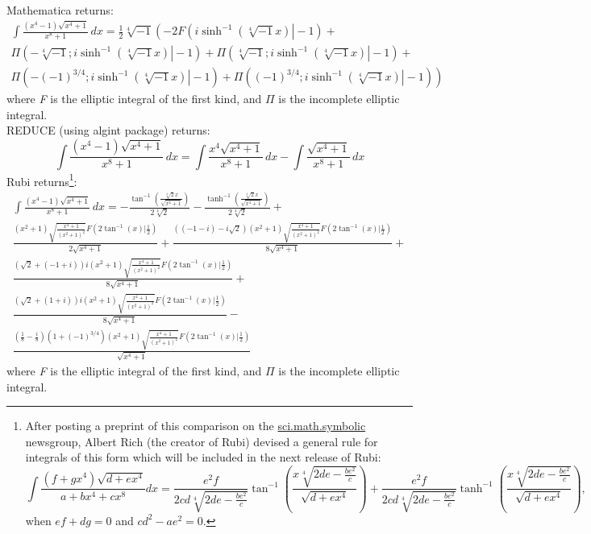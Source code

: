 \documentclass[12pt]{article}
\numberwithin{equation}{section}
\theoremstyle{definition}
\begin{document}
\normalsize
Mathematica returns:
\small
\begin{multline*}
\int \frac{\left(x^4-1\right) \sqrt{x^4+1}}{x^8+1} \, dx = \frac{1}{2} \sqrt[4]{-1} \left(-2 F\left(\left.i \sinh ^{-1}\left(\sqrt[4]{-1} x\right)\right|-1\right) \right. + \\
\Pi\left(-\sqrt[4]{-1};\left.i \sinh ^{-1}\left(\sqrt[4]{-1} x\right)\right|-1\right) + 
\Pi \left(\sqrt[4]{-1};\left.i \sinh ^{-1}\left(\sqrt[4]{-1} x\right)\right|-1\right) + \\
\left. \Pi\left(-(-1)^{3/4};\left.i \sinh ^{-1}\left(\sqrt[4]{-1} x\right)\right|-1\right)+\Pi \left((-1)^{3/4};\left.i \sinh ^{-1}\left(\sqrt[4]{-1} x\right)\right|-1\right)\right)
\end{multline*}
\normalsize
where \textit{F} is the elliptic integral of the first kind, and $\Pi$ is the incomplete elliptic integral. \\

\noindent REDUCE (using algint package) returns:
\small
$$\int \frac{\left(x^4-1\right) \sqrt{x^4+1}}{x^8+1} \, dx = 
\int \frac{x^4 \sqrt{x^4+1}}{x^8+1} \, dx-\int \frac{\sqrt{x^4+1}}{x^8+1} \, dx$$
\normalsize
Rubi returns\footnote{After posting a preprint of this comparison on the 
\href{https://groups.google.com/forum/\#!forum/sci.math.symbolic}{sci.math.symbolic}
newsgroup, Albert Rich (the creator of Rubi) devised a general rule for integrals of this 
form which will be included in the next release of Rubi: %
$$\int\frac{\left(f+g x^4\right)\sqrt{d+e x^4}}{a+b x^4+c x^8} dx = 
\frac{e^2 f}{2 c d \sqrt[4]{2 d e-\frac{b e^2}{c}}} \tan ^{-1}\left(\frac{x \sqrt[4]{2 d e-\frac{b e^2}{c}}}{\sqrt{d+e x^4}}\right) 
	+\frac{e^2 f}{2 c d \sqrt[4]{2 d e-\frac{b e^2}{c}}} \tanh ^{-1}\left(\frac{x \sqrt[4]{2 d e-\frac{be^2}{c}}}{\sqrt{d+e x^4}}\right),$$ when $e f+d g=0$ and $c d^2-a e^2=0$.}:
\small
\begin{multline*}
\int \frac{\left(x^4-1\right) \sqrt{x^4+1}}{x^8+1} \, dx=
-\frac{\tan ^{-1}\left(\frac{\sqrt[4]{2} x}{\sqrt{x^4+1}}\right)}{2 \sqrt[4]{2}}-
\frac{\tanh^{-1}\left(\frac{\sqrt[4]{2} x}{\sqrt{x^4+1}}\right)}{2 \sqrt[4]{2}} + \\
\frac{\left(x^2+1\right) \sqrt{\frac{x^4+1}{\left(x^2+1\right)^2}} F\left(2\tan ^{-1}(x)|\frac{1}{2}\right)}{2 \sqrt{x^4+1}} + 
\frac{\left((-1-i)-i \sqrt{2}\right) \left(x^2+1\right) \sqrt{\frac{x^4+1}{\left(x^2+1\right)^2}}
F\left(2 \tan ^{-1}(x)|\frac{1}{2}\right)}{8 \sqrt{x^4+1}} + \\
\frac{\left(\sqrt{2}+(-1+i)\right) i \left(x^2+1\right) \sqrt{\frac{x^4+1}{\left(x^2+1\right)^2}}
F\left(2 \tan ^{-1}(x)|\frac{1}{2}\right)}{8 \sqrt{x^4+1}} + \\
\frac{\left(\sqrt{2}+(1+i)\right) i \left(x^2+1\right) \sqrt{\frac{x^4+1}{\left(x^2+1\right)^2}}
F\left(2 \tan ^{-1}(x)|\frac{1}{2}\right)}{8 \sqrt{x^4+1}} - \\
\frac{\left(\frac{1}{8}-\frac{i}{8}\right) \left(1+(-1)^{3/4}\right) \left(x^2+1\right)
\sqrt{\frac{x^4+1}{\left(x^2+1\right)^2}} F\left(2 \tan ^{-1}(x)|\frac{1}{2}\right)}{\sqrt{x^4+1}}
\end{multline*}
\normalsize
where \textit{F} is the elliptic integral of the first kind, and $\Pi$ is the incomplete elliptic integral. \\
\end{document}
